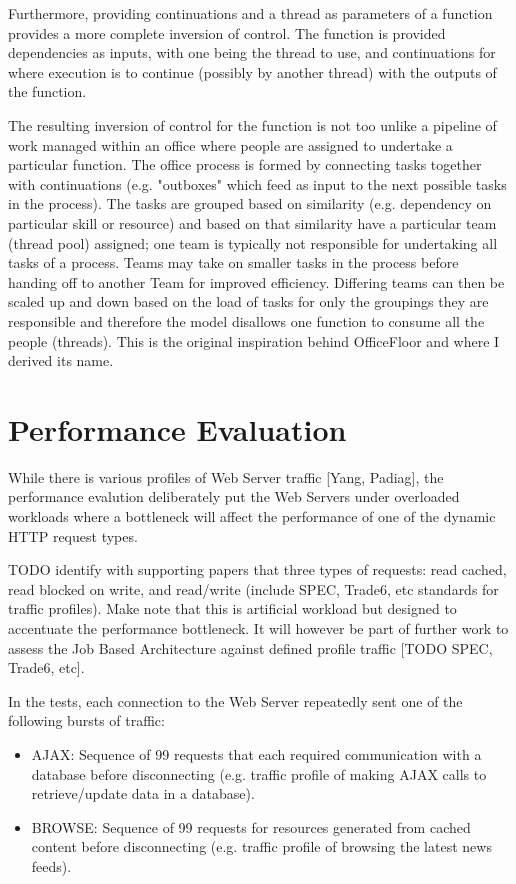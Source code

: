 \documentclass[conference]{ieee/IEEEtran}
\begin{document}
Furthermore, providing continuations and a thread as parameters of a function
provides a more complete inversion of control.  The function is provided
dependencies as inputs, with one being the thread to use, and continuations for
where execution is to continue (possibly by another thread) with the outputs of
the function.

The resulting inversion of control for the function is not too unlike a
pipeline of work managed within an office where people are assigned to
undertake a particular function.  The office process is formed by connecting
tasks together with continuations (e.g. "outboxes" which feed as input to the
next possible tasks in the process).  The tasks are grouped based on similarity
(e.g. dependency on particular skill or resource) and based on that similarity
have a particular team (thread pool) assigned; one team is typically not
responsible for undertaking all tasks of a process.  Teams may take on smaller
tasks in the process before handing off to another Team for improved
efficiency.  Differing teams can then be scaled up and down based on the load
of tasks for only the groupings they are responsible and therefore the model
disallows one function to consume all the people (threads).  This is the
original inspiration behind OfficeFloor and where I derived its name.

\section{Performance Evaluation}
While there is various profiles of Web Server traffic [Yang, Padiag], the
performance evalution deliberately put the Web Servers under overloaded
workloads where a bottleneck will affect the performance of one of the dynamic
HTTP request types.

TODO identify with supporting papers that three types of requests: read cached,
read blocked on write, and read/write  (include SPEC, Trade6, etc standards for
traffic profiles).  Make note that this is artificial workload but designed to
accentuate the performance bottleneck.  It will however be part of further work
to assess the Job Based Architecture against defined profile traffic [TODO
SPEC, Trade6, etc].

In the tests, each connection to the Web Server repeatedly sent one of the
following bursts of traffic:
\begin{itemize}
\item AJAX: Sequence of 99 requests that each required communication with a
database before disconnecting (e.g. traffic profile of making AJAX calls to
retrieve/update data in a database).
\item BROWSE: Sequence of 99 requests for resources generated from cached
content before disconnecting (e.g. traffic profile of browsing the latest news
feeds).
\end{itemize}
\end{document}
